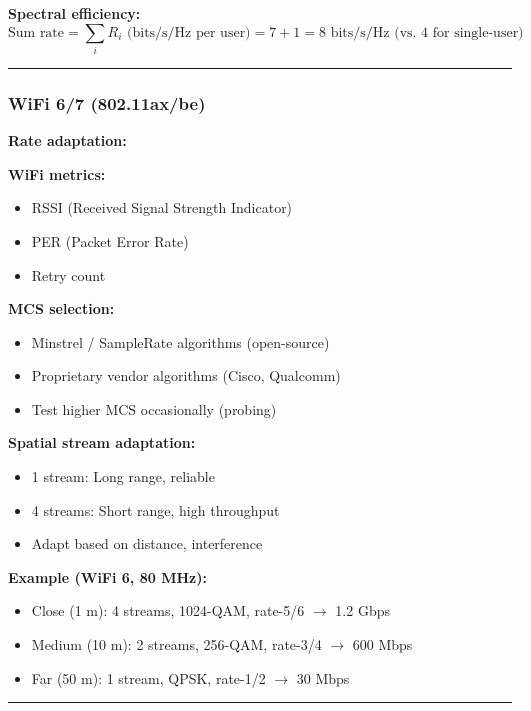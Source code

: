 \textbf{Spectral efficiency:}
\begin{equation*}
\text{Sum rate} = \sum_{i} R_i \text{ (bits/s/Hz per user)} = 7 + 1 = 8 \text{ bits/s/Hz (vs. 4 for single-user)}
\end{equation*}

\begin{center}\rule{0.5\linewidth}{0.5pt}\end{center}

\subsubsection{WiFi 6/7 (802.11ax/be)}\label{wifi-67-802.11axbe}

\textbf{Rate adaptation:}

\textbf{WiFi metrics:}
\begin{itemize}
\item RSSI (Received Signal Strength Indicator)
\item PER (Packet Error Rate)
\item Retry count
\end{itemize}

\textbf{MCS selection:}
\begin{itemize}
\item Minstrel / SampleRate algorithms (open-source)
\item Proprietary vendor algorithms (Cisco, Qualcomm)
\item Test higher MCS occasionally (probing)
\end{itemize}

\textbf{Spatial stream adaptation:}
\begin{itemize}
\item 1 stream: Long range, reliable
\item 4 streams: Short range, high throughput
\item Adapt based on distance, interference
\end{itemize}

\textbf{Example (WiFi 6, 80 MHz):}
\begin{itemize}
\item Close (1 m): 4 streams, 1024-QAM, rate-5/6 $\rightarrow$ 1.2 Gbps
\item Medium (10 m): 2 streams, 256-QAM, rate-3/4 $\rightarrow$ 600 Mbps
\item Far (50 m): 1 stream, QPSK, rate-1/2 $\rightarrow$ 30 Mbps
\end{itemize}

\begin{center}\rule{0.5\linewidth}{0.5pt}\end{center}

